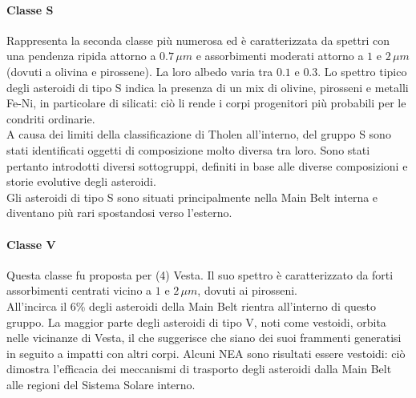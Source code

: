 \paragraph*{Classe S}
Rappresenta la seconda classe più numerosa ed è caratterizzata da spettri con una pendenza ripida attorno a $0.7\,\mu m$ e assorbimenti moderati attorno a $1$ e $2\,\mu m$ (dovuti a olivina e pirossene). La loro albedo varia tra $0.1$ e $0.3$. Lo spettro tipico degli asteroidi di tipo S indica la presenza di un mix di olivine, pirosseni e metalli Fe-Ni, in particolare di silicati: ciò li rende i corpi progenitori più probabili per le condriti ordinarie.\\
A causa dei limiti della classificazione di Tholen all’interno, del gruppo S sono stati identificati oggetti di composizione molto diversa tra loro. Sono stati pertanto introdotti diversi sottogruppi, definiti in base alle diverse composizioni e storie evolutive degli asteroidi.\\
Gli asteroidi di tipo S sono situati principalmente nella Main Belt interna e diventano più rari spostandosi verso l'esterno.

\paragraph*{Classe V}
Questa classe fu proposta per (4) Vesta. Il suo spettro è caratterizzato da forti assorbimenti centrati vicino a $1$ e $2\,\mu m$, dovuti ai pirosseni.\\
All'incirca il 6\% degli asteroidi della Main Belt rientra all'interno di questo gruppo. La maggior parte degli asteroidi di tipo V, noti come vestoidi, orbita nelle vicinanze di Vesta, il che suggerisce che siano dei suoi frammenti generatisi in seguito a impatti con altri corpi. Alcuni NEA sono risultati essere vestoidi: ciò dimostra l'efficacia dei meccanismi di trasporto degli asteroidi dalla Main Belt alle regioni del Sistema Solare interno.

